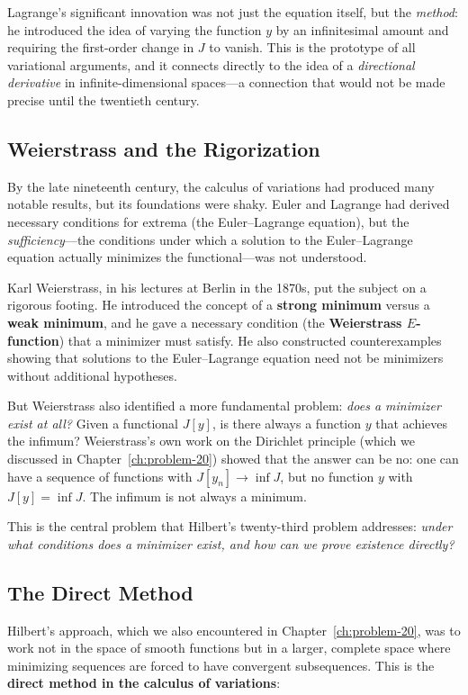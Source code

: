 Lagrange's significant innovation was not just the equation itself, but the \emph{method}: he introduced the idea of varying the function $y$ by an infinitesimal amount and requiring the first-order change in $J$ to vanish. This is the prototype of all variational arguments, and it connects directly to the idea of a \emph{directional derivative} in infinite-dimensional spaces---a connection that would not be made precise until the twentieth century.

\subsection{Weierstrass and the Rigorization}

By the late nineteenth century, the calculus of variations had produced many notable results, but its foundations were shaky. Euler and Lagrange had derived necessary conditions for extrema (the Euler--Lagrange equation), but the \emph{sufficiency}---the conditions under which a solution to the Euler--Lagrange equation actually minimizes the functional---was not understood.

Karl Weierstrass, in his lectures at Berlin in the 1870s, put the subject on a rigorous footing. He introduced the concept of a \textbf{strong minimum} versus a \textbf{weak minimum}, and he gave a necessary condition (the \textbf{Weierstrass $E$-function}) that a minimizer must satisfy. He also constructed counterexamples showing that solutions to the Euler--Lagrange equation need not be minimizers without additional hypotheses.

But Weierstrass also identified a more fundamental problem: \emph{does a minimizer exist at all?} Given a functional $J[y]$, is there always a function $y$ that achieves the infimum? Weierstrass's own work on the Dirichlet principle (which we discussed in Chapter~\ref{ch:problem-20}) showed that the answer can be no: one can have a sequence of functions with $J[y_n] \to \inf J$, but no function $y$ with $J[y] = \inf J$. The infimum is not always a minimum.

This is the central problem that Hilbert's twenty-third problem addresses: \emph{under what conditions does a minimizer exist, and how can we prove existence directly?}

\subsection{The Direct Method}

Hilbert's approach, which we also encountered in Chapter~\ref{ch:problem-20}, was to work not in the space of smooth functions but in a larger, complete space where minimizing sequences are forced to have convergent subsequences. This is the \textbf{direct method in the calculus of variations}:

